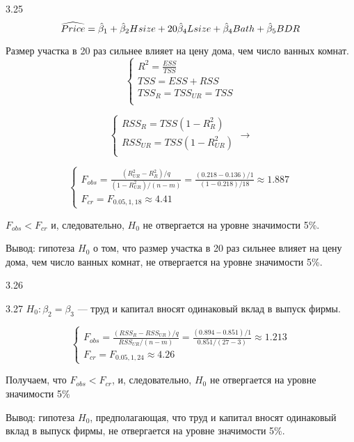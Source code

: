 \protect \hypertarget {soln:3.25}{}
\begin{solution}{{3.25}}
\[
\widehat{Price}= \hat{\beta}_1+\hat{\beta}_2 Hsize+20\hat{\beta}_4 Lsize+\hat{\beta}_4 Bath + \hat{\beta}_5 BDR
\]

Размер участка в 20 раз сильнее влияет на цену дома, чем число ванных комнат.
\[
\begin{cases}
R^2=\frac{ESS}{TSS}\\
TSS=ESS+RSS\\
TSS_R=TSS_{UR}=TSS\\
\end{cases}
\]

\[
\begin{cases}
RSS_{R}=TSS(1-R^2_{R})\\
RSS_{UR}=TSS(1-R^2_{UR})\\
\end{cases} \to
\]

\[
\begin{cases}
F_{obs}=\frac{(R_{UR}^2-R_{R}^2)/q}{(1-R^2_{UR})/(n-m)}=\frac{(0.218-0.136)/1}{(1-0.218)/18}\approx 1.887\\
F_{cr}= F_{0.05,1,18}\approx 4.41
\end{cases}
\]

$F_{obs}<F_{cr}$ и, следовательно, $H_0$ не отвергается на уровне значимости 5\%.

Вывод: гипотеза $H_0$ о том, что размер участка в 20 раз сильнее влияет на цену дома, чем число ванных комнат, не отвергается на уровне значимости 5\%.
\end{solution}
\protect \hypertarget {soln:3.26}{}
\begin{solution}{{3.26}}
\end{solution}
\protect \hypertarget {soln:3.27}{}
\begin{solution}{{3.27}}
$H_0: \beta_2=\beta_3$ — труд и капитал вносят одинаковый вклад в выпуск фирмы.

\[
\begin{cases}
F_{obs}=\frac{(RSS_R-RSS_{UR})/q}{RSS_{UR}/(n-m)}=\frac{(0.894-0.851)/1}{0.851/(27-3)}\approx 1.213\\
F_{cr}= F_{0.05,1,24}\approx 4.26
\end{cases}
\]

Получаем, что $F_{obs}<F_{cr}$, и, следовательно, $H_0$ не отвергается на уровне значимости 5\%

Вывод: гипотеза $H_0$, предполагающая, что труд и капитал вносят одинаковый вклад в выпуск фирмы, не отвергается на уровне значимости 5\%.
\end{solution}
